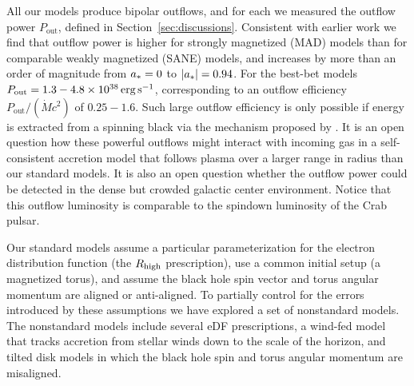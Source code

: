All our models produce bipolar outflows, and for each we measured the outflow power $P_\mathrm{out}$, defined in Section~\ref{sec:discussions}. Consistent with earlier work we find that outflow power is higher for strongly magnetized (MAD) models than for comparable weakly magnetized (SANE) models, and increases by more than an order of magnitude from $a_* = 0$ to $|a_*| = 0.94$.  For the best-bet models $P_\mathrm{out} = 1.3-4.8 \times 10^{38}\,\mathrm{erg\,s^{-1}}$, corresponding to an outflow efficiency $P_\mathrm{out} /(\dot{M} c^2)$ of $0.25 - 1.6$.  Such large  outflow efficiency is only possible if energy is extracted from a spinning black via the mechanism proposed by  \cite{1977MNRAS.179..433B}.  It is an open question how these powerful outflows might interact with incoming gas in a self-consistent accretion model that follows plasma over a larger range in radius than our standard models.  It is also an open question whether the outflow power could be detected in the dense but crowded galactic center environment.  Notice that this outflow luminosity is comparable to the spindown luminosity of the Crab pulsar.

Our standard models assume a particular parameterization for the electron distribution function (the $R_\mathrm{high}$ prescription), use a common initial setup (a magnetized torus), and assume the black hole spin vector and torus angular momentum are aligned or anti-aligned.  To partially control for the errors introduced by these assumptions we have explored a set of nonstandard models.  The nonstandard models include several eDF prescriptions, a wind-fed model that tracks accretion from stellar winds down to the scale of the horizon, and tilted disk models in which the black hole spin and torus angular momentum are misaligned.


